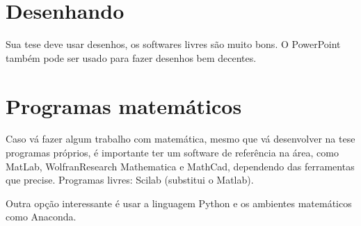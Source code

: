 \section{Desenhando}

Sua tese deve usar desenhos, os softwares livres são muito bons. O PowerPoint também pode ser usado para fazer desenhos bem decentes.

\section{Programas matemáticos}

Caso vá fazer algum trabalho com matemática, mesmo que vá desenvolver na tese programas próprios, é importante ter um software de referência na área, como MatLab, WolfranResearch Mathematica e MathCad, dependendo das ferramentas que precise.
Programas livres: Scilab (substitui o Matlab). 

Outra opção interessante é usar a linguagem Python e os ambientes matemáticos como Anaconda.
